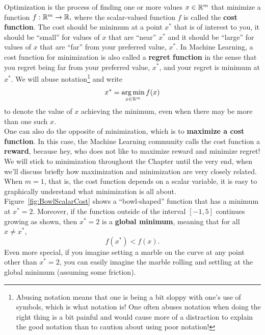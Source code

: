 Optimization is the process of finding one or more values $x\in \mathbb R^m$ that minimize a function $f: \mathbb R^m \to \mathbb R,$ 
where the scalar-valued function $f$ is called the \textbf{cost function}. The cost should be minimum at a point $x^\ast$ that is of interest to you, it should be ``small'' for values of $x$ that are ``near'' $x^\ast$ and it should be ``large'' for values of $x$ that are ``far'' from your preferred value, $x^\ast$. In Machine Learning, a cost function for minimization is also called a \textbf{regret function} in the sense that you regret being far from your preferred value, $x^\ast$, and your regret is minimum at $x^\ast$. We will abuse notation\footnote{Abusing notation means that one is being a bit sloppy with one's use of symbols, which is what notation is! One often abuses notation when doing the right thing is a bit painful and would cause more of a distraction to explain the good notation than to caution about using poor notation!} and write
\begin{equation}
    \label{eq:ArgMinAbuseNotation}
    x^\ast = \operatorname*{arg\,min}_{x\in \mathbb R^m} f(x)
\end{equation}
to denote the value of $x$ achieving the minimum, even when there may be more than one such $x$.\\

One can also do the opposite of minimization, which is to \textbf{maximize a cost function}. In this case, the Machine Learning community calls the cost function a \textbf{reward}, because hey, who does not like to maximize reward and minimize regret! We will stick to minimization throughout the Chapter until the very end, when we'll discuss briefly how maximization and minimization are very closely related.\\

When $m=1$, that is, the cost function depends on a scalar variable, it is easy to graphically understand what minimization is all about. Figure~\ref{fig:BowlScalarCost} shows a ``bowl-shaped'' function that has a minimum at $x^\ast=2$. Moreover, if the function outside of the interval $[-1, 5]$ continues growing as shown, then $x^\ast=2$ is a \textbf{global minimum}, meaning that for all $x \neq x^\ast$, 
$$f(x^\ast) < f(x).$$ 
Even more special, if you imagine setting a marble on the curve at any point other than $x^\ast=2$, you can easily imagine the marble rolling and settling at the global minimum (assuming some friction).\\ 




